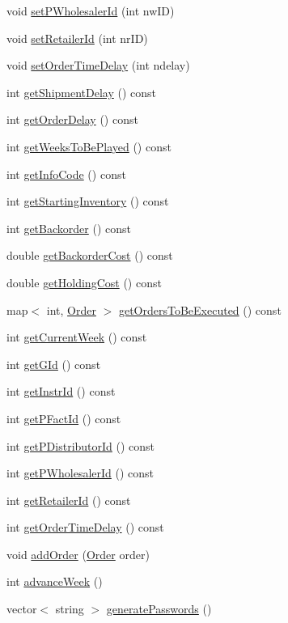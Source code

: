 \begin{DoxyCompactItemize}
\item 
void \hyperlink{classGame_a6cfdb34ff66e98c193dfc918a961ce66}{set\+P\+Wholesaler\+Id} (int nw\+ID)
\item 
void \hyperlink{classGame_a33ada7d6482601e8f5c2d16731b6ac10}{set\+Retailer\+Id} (int nr\+ID)
\item 
void \hyperlink{classGame_acf5b10b8b268b443600518240a1591b5}{set\+Order\+Time\+Delay} (int ndelay)
\item 
int \hyperlink{classGame_ab25852cc4c2df47382d33cfe3c2b55d0}{get\+Shipment\+Delay} () const
\item 
int \hyperlink{classGame_ab68ef87715311bea275bdac17342f2bd}{get\+Order\+Delay} () const
\item 
int \hyperlink{classGame_a3a9810e55fb1b4b5df6c887811c73885}{get\+Weeks\+To\+Be\+Played} () const
\item 
int \hyperlink{classGame_aafa386030ee084fe10699ec84316e689}{get\+Info\+Code} () const
\item 
int \hyperlink{classGame_aab794be46d7e7d8832ca6b5430cd61e2}{get\+Starting\+Inventory} () const
\item 
int \hyperlink{classGame_a679d1b8cccec8ef599afba5fc05e254f}{get\+Backorder} () const
\item 
double \hyperlink{classGame_ac00135b6b5128aca74b09e9f79d54b60}{get\+Backorder\+Cost} () const
\item 
double \hyperlink{classGame_a0842aaa236062f2a9dd7e9d32f0be131}{get\+Holding\+Cost} () const
\item 
map$<$ int, \hyperlink{classOrder}{Order} $>$ \hyperlink{classGame_a7bb6c8a67ab9e3c0eb9b6c8892ce4084}{get\+Orders\+To\+Be\+Executed} () const
\item 
int \hyperlink{classGame_aa4d5959a4edb54d944b93c83725229aa}{get\+Current\+Week} () const
\item 
int \hyperlink{classGame_a13a42860435b979445a5e74b9ca4855a}{get\+G\+Id} () const
\item 
int \hyperlink{classGame_a2fb39179e66606280c4d6408ffac0012}{get\+Instr\+Id} () const
\item 
int \hyperlink{classGame_a39a79914de4376873a17d90e5c916b10}{get\+P\+Fact\+Id} () const
\item 
int \hyperlink{classGame_adfa63d3dd6455a8ba8530baf322c70c4}{get\+P\+Distributor\+Id} () const
\item 
int \hyperlink{classGame_af6934f2c39a6c6c99519f6081b56d6b7}{get\+P\+Wholesaler\+Id} () const
\item 
int \hyperlink{classGame_add0239e447bd78f762a53f75da31f07e}{get\+Retailer\+Id} () const
\item 
int \hyperlink{classGame_ac33e4608fc0971b4280ab16fb7dafde4}{get\+Order\+Time\+Delay} () const
\item 
void \hyperlink{classGame_a0e6b1f8c9d598c7eb860d04c218fa546}{add\+Order} (\hyperlink{classOrder}{Order} order)
\item 
int \hyperlink{classGame_a8471ea91ed18fc2d289eb23747d11d39}{advance\+Week} ()
\item 
vector$<$ string $>$ \hyperlink{classGame_a88a61be96d6266e6b7efaae089b43ff5}{generate\+Passwords} ()
\end{DoxyCompactItemize}


